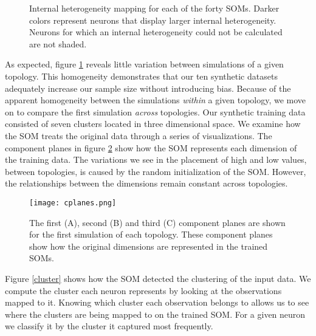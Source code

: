 \begin{figure}[ht]
\centering
\begin{minipage}{\textwidth}
\caption{Internal heterogeneity mapping for each of the forty SOMs. Darker colors
represent neurons that display larger internal heterogeneity. Neurons for which
an internal heterogeneity could not be calculated are not shaded.}
\label{ten}
\end{minipage}
\end{figure}

As expected, figure \ref{ten} reveals little variation 
between simulations of a given topology.  This homogeneity demonstrates that
our ten synthetic datasets adequately increase our sample size without introducing bias.  
Because of the apparent homogeneity between the simulations \emph{within} a
given topology, we move on to compare the first simulation \emph{across} topologies.  
Our synthetic training data consisted of seven clusters located in three
dimensional space. We examine how the SOM treats the original data through a
series of visualizations.  The component planes in figure \ref{cplanes} show
how the SOM represents each dimension of the training data.  The variations we
see in the placement of high and low values, between topologies, is caused by
the random initialization of the SOM.  However, the relationships between the
dimensions remain constant across topologies. 

\begin{figure}[ht]
\begin{minipage}{\textwidth}
  \texttt{[image: cplanes.png]}
  \caption{The first (A), second (B) and third (C) component planes are shown
for the first simulation of each topology.  These component planes show how
the original dimensions are represented in the trained SOMs.}
  \label{cplanes}
\end{minipage}\end{figure}



Figure \ref{cluster} shows how the SOM detected the clustering of the input
data.  We compute the cluster each neuron represents by looking at the
observations mapped to it.  Knowing which cluster each observation belongs to
allows us to see where the clusters are being mapped to on the trained SOM. For a
given neuron we classify it by the cluster it captured most frequently. 

